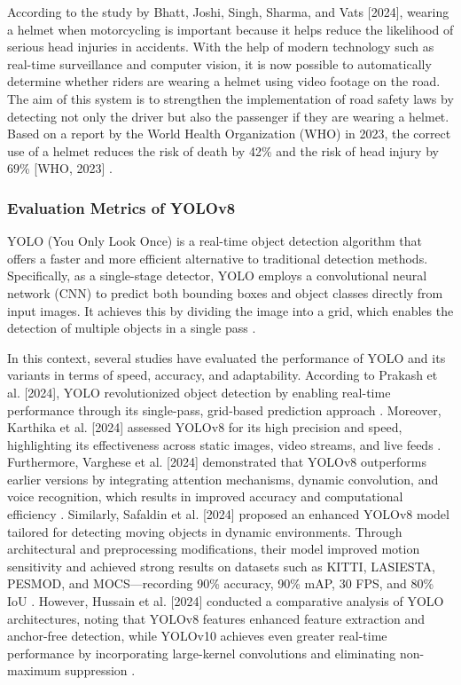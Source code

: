 \begin{refsection}
According to the study by Bhatt, Joshi, Singh, Sharma, and Vats [2024], wearing a helmet when motorcycling is important because it helps reduce the likelihood of serious head injuries in accidents. With the help of modern technology such as real-time surveillance and computer vision, it is now possible to automatically determine whether riders are wearing a helmet using video footage on the road. The aim of this system is to strengthen the implementation of road safety laws by detecting not only the driver but also the passenger if they are wearing a helmet. Based on a report by the World Health Organization (WHO) in 2023, the correct use of a helmet reduces the risk of death by 42\% and the risk of head injury by 69\% [WHO, 2023] \cite{bhatt2024ai}.

\subsubsection{Evaluation Metrics of YOLOv8}
YOLO (You Only Look Once) is a real-time object detection algorithm that offers a faster and more efficient alternative to traditional detection methods. Specifically, as a single-stage detector, YOLO employs a convolutional neural network (CNN) to predict both bounding boxes and object classes directly from input images. It achieves this by dividing the image into a grid, which enables the detection of multiple objects in a single pass \cite {kili2023yolo}. 

In this context, several studies have evaluated the performance of YOLO and its variants in terms of speed, accuracy, and adaptability. According to Prakash et al. [2024], YOLO revolutionized object detection by enabling real-time performance through its single-pass, grid-based prediction approach \cite{prakash2024study}. Moreover, Karthika et al. [2024] assessed YOLOv8 for its high precision and speed, highlighting its effectiveness across static images, video streams, and live feeds \cite{karthika2024automated}. Furthermore, Varghese et al. [2024] demonstrated that YOLOv8 outperforms earlier versions by integrating attention mechanisms, dynamic convolution, and voice recognition, which results in improved accuracy and computational efficiency \cite{Varghese2024}. Similarly, Safaldin et al. [2024] proposed an enhanced YOLOv8 model tailored for detecting moving objects in dynamic environments. Through architectural and preprocessing modifications, their model improved motion sensitivity and achieved strong results on datasets such as KITTI, LASIESTA, PESMOD, and MOCS—recording 90\% accuracy, 90\% mAP, 30 FPS, and 80\% IoU \cite{Safaldin2024}. However, Hussain et al. [2024] conducted a comparative analysis of YOLO architectures, noting that YOLOv8 features enhanced feature extraction and anchor-free detection, while YOLOv10 achieves even greater real-time performance by incorporating large-kernel convolutions and eliminating non-maximum suppression \cite{hussain2024yolo}.
     

\end{refsection}
